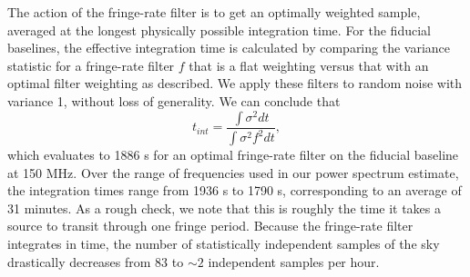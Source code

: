 \documentclass[twocolumn,numberedappendix]{emulateapj} \shorttitle{New Limits on the 21 cm Power Spectrum at $z=8.4$}
\begin{document}
The action of the fringe-rate filter is to get an optimally weighted
sample, averaged at the longest physically possible integration time.  For the
fiducial baselines, the effective
integration time is calculated by comparing the variance statistic for a
fringe-rate filter $f$ that is a flat weighting versus that with an optimal filter
weighting as described. We apply these filters to random noise with variance 1,
without loss of generality. We can conclude that 
\begin{equation}
    t_{int} = \frac{\int{\sigma^{2}dt}}{\int{\sigma^{2}f^{2}dt}},
\end{equation}
which evaluates to 1886 s for an optimal fringe-rate filter on the fiducial 
baseline at 150 MHz.  Over the range of frequencies used in our power spectrum
estimate, the integration times range from 1936 s to 1790 s, corresponding to an
average of 31 minutes. As a rough check, we note that this is roughly the time
it takes a source to transit through one fringe period.
Because
the fringe-rate filter integrates in time, the number of statistically
independent samples of the sky drastically decreases from 83 to $\sim2$
independent samples per hour.

%

\end{document}
